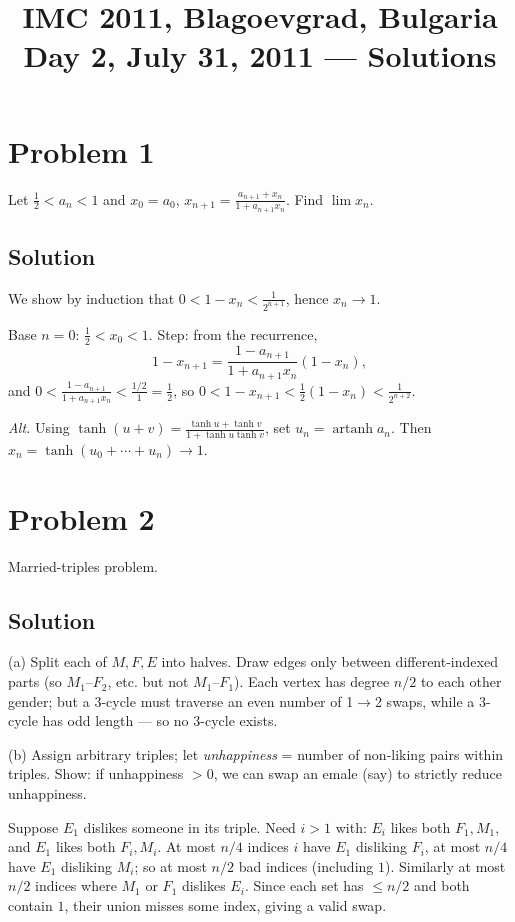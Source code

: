\documentclass{article}
\title{IMC 2011, Blagoevgrad, Bulgaria \\ Day 2, July 31, 2011 --- Solutions}
\date{}
\begin{document}
\maketitle

\section*{Problem 1}
Let $\tfrac{1}{2} < a_n < 1$ and $x_0 = a_0$, $x_{n+1} = \tfrac{a_{n+1} + x_n}{1 + a_{n+1} x_n}$. Find $\lim x_n$.

\subsection*{Solution}
We show by induction that $0 < 1 - x_n < \tfrac{1}{2^{n+1}}$, hence $x_n \to 1$.

Base $n = 0$: $\tfrac{1}{2} < x_0 < 1$. Step: from the recurrence,
\[
1 - x_{n+1} = \frac{1 - a_{n+1}}{1 + a_{n+1} x_n}(1 - x_n),
\]
and $0 < \tfrac{1 - a_{n+1}}{1 + a_{n+1} x_n} < \tfrac{1/2}{1} = \tfrac{1}{2}$, so $0 < 1 - x_{n+1} < \tfrac{1}{2}(1 - x_n) < \tfrac{1}{2^{n+2}}$.

\emph{Alt.} Using $\tanh(u+v) = \tfrac{\tanh u + \tanh v}{1 + \tanh u \tanh v}$, set $u_n = \operatorname{artanh} a_n$. Then $x_n = \tanh(u_0 + \cdots + u_n) \to 1$.

\section*{Problem 2}
Married-triples problem.

\subsection*{Solution}
(a) Split each of $M, F, E$ into halves. Draw edges only between different-indexed parts (so $M_1$--$F_2$, etc. but not $M_1$--$F_1$). Each vertex has degree $n/2$ to each other gender; but a 3-cycle must traverse an even number of 1$\to$2 swaps, while a 3-cycle has odd length --- so no 3-cycle exists.

(b) Assign arbitrary triples; let \emph{unhappiness} = number of non-liking pairs within triples. Show: if unhappiness $> 0$, we can swap an emale (say) to strictly reduce unhappiness.

Suppose $E_1$ dislikes someone in its triple. Need $i > 1$ with: $E_i$ likes both $F_1, M_1$, and $E_1$ likes both $F_i, M_i$. At most $n/4$ indices $i$ have $E_1$ disliking $F_i$, at most $n/4$ have $E_1$ disliking $M_i$; so at most $n/2$ bad indices (including $1$). Similarly at most $n/2$ indices where $M_1$ or $F_1$ dislikes $E_i$. Since each set has $\le n/2$ and both contain $1$, their union misses some index, giving a valid swap.
\end{document}
